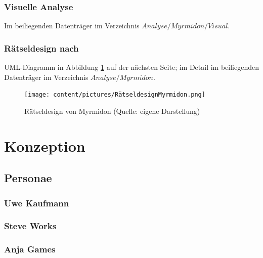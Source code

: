 \documentclass[
	12pt,
	a4paper,
	bibtotoc,
	cleardoubleempty, 
	idxtotoc,
	ngerman,
	openright
	final,
	listof=nochaptergap,
	]{scrbook}
\begin{document}
\begin{appendices}
\subsubsection{Visuelle Analyse}\label{sec:append_anylsis_m_visual}
Im beiliegenden Datenträger im Verzeichnis $Analyse/Myrmidon/Visual$.

\subsubsection{Rätseldesign nach \cite{tim_schafer_grim_1996}}\label{sec:append_riddles_m}
UML-Diagramm in Abbildung \ref{fig:m-uml} auf der nächsten Seite; im Detail im beiliegenden Datenträger im Verzeichnis $Analyse/Myrmidon$.

\newpage

\begin{figure}[ht]
\centering
\texttt{[image: content/pictures/RätseldesignMyrmidon.png]}
\caption{Rätseldesign von Myrmidon (Quelle: eigene Darstellung)}
\label{fig:m-uml}
\end{figure}

\clearpage

\section{Konzeption}

\subsection{Personae}\label{sec:append_concept_personae}

\subsubsection{Uwe Kaufmann}




\clearpage

\subsubsection{Steve Works}



\clearpage

\subsubsection{Anja Games}


\end{appendices}
\end{document}
